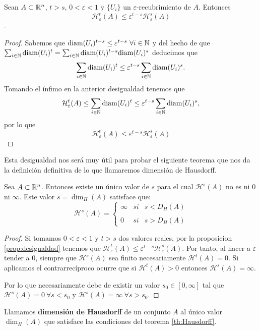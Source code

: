 \begin{proposicion}
  \label{prop:desigualdad}
  Sean $A\subset \mathbb{R}^n$, $t>s$, $0<\varepsilon<1$ y $\{U_i\}$ un $\varepsilon$-recubrimiento de $A$. Entonces 
  $$\mathcal{H}_\varepsilon^t(A)\leq \varepsilon^{t-s}\mathcal{H}_\varepsilon^s(A)$$. 
\end{proposicion}
\begin{proof}
  Sabemos que $\mathrm{diam}(U_i)^{t-s}\leq\varepsilon^{t-s} \ \forall i\in \mathbb{N}$ y del hecho de que $\sum_{i\in\mathbb{N}}\mathrm{diam}(U_i)^t=\sum_{i\in\mathbb{N}}\mathrm{diam}(U_i)^{t-s}\mathrm{diam}(U_i)^s$ deducimos que 
  $$
  \sum_{i\in\mathbb{N}}\mathrm{diam}(U_i)^t\leq\varepsilon^{t-s}\sum_{i\in\mathbb{N}}\mathrm{diam}(U_i)^{s}.
  $$
  Tomando el ínfimo en la anterior desigualdad tenemos que
  $$
  \mathcal{H}_\varepsilon^t(A)\leq\sum_{i\in\mathbb{N}}\mathrm{diam}(U_i)^t\leq\varepsilon^{t-s}\sum_{i\in\mathbb{N}}\mathrm{diam}(U_i)^{s},
  $$
  por lo que
  $$\mathcal{H}_\varepsilon^t(A)\leq \varepsilon^{t-s}\mathcal{H}_\varepsilon^s(A)$$

\end{proof}

Esta desigualdad nos será muy útil para probar el siguiente teorema que nos da la definición definitiva de lo que llamaremos dimensión de Hausdorff.

\begin{teorema}
\label{th:Hausdorff}
Sea $A\subset \mathbb{R}^n$. Entonces existe un único valor de $s$ para el cual $\mathcal{H}^s(A)$ no es ni $0$ ni $\infty$. Este valor $s=\dim_H(A)$ satisface que:
\begin{equation}
\mathcal H^s(A)= \left\{ \begin{array}{lcc}
             \infty &   si  & s < D_H(A) \\
             \\ 0 &  si & s > D_H(A) 
             \end{array}
   \right.
\end{equation}
\end{teorema} 
\begin{proof}
  Si tomamos $0<\varepsilon<1$ y $t>s$ dos valores reales, por la proposicion \ref{prop:desigualdad} tenemos que $\mathcal{H}_\varepsilon^t(A)\leq \varepsilon^{t-s}\mathcal{H}_\varepsilon^s(A)$. Por tanto, al hacer a $\varepsilon$ tender a $0$, siempre que $\mathcal{H}^s(A)$ sea finito necesariamente $\mathcal{H}^t(A)=0$. Si aplicamos el contrarrecíproco ocurre que si $\mathcal{H}^t(A)>0$ entonces $\mathcal{H}^s(A)=\infty$.

  Por lo que necesariamente debe de existir un valor $s_0\in[0,\infty]$ tal que $\mathcal{H}^s(A)=0 \ \forall s<s_0$ y $\mathcal{H}^s(A)=\infty \ \forall s>s_0$.
\end{proof}
\begin{definicion}
Llamamos \textbf{dimensión de Hausdorff} de un conjunto $A$ al único valor $\dim_H(A)$ que satisface las condiciones del teorema \ref{th:Hausdorff}.
\end{definicion}

